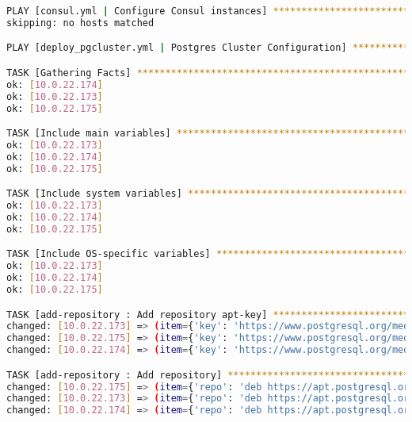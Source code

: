 \begin{flushleft}
\begin{lstlisting}[language=bash, caption=Deploy - Anhang - Deployt,captionpos=b,label={lst:deploy-appendix-deployt},breaklines=true]
PLAY [consul.yml | Configure Consul instances] ********************************************************************************************************************************************************************
skipping: no hosts matched

PLAY [deploy_pgcluster.yml | Postgres Cluster Configuration] ******************************************************************************************************************************************************

TASK [Gathering Facts] ********************************************************************************************************************************************************************************************
ok: [10.0.22.174]
ok: [10.0.22.173]
ok: [10.0.22.175]

TASK [Include main variables] *************************************************************************************************************************************************************************************
ok: [10.0.22.173]
ok: [10.0.22.174]
ok: [10.0.22.175]

TASK [Include system variables] ***********************************************************************************************************************************************************************************
ok: [10.0.22.173]
ok: [10.0.22.174]
ok: [10.0.22.175]

TASK [Include OS-specific variables] ******************************************************************************************************************************************************************************
ok: [10.0.22.173]
ok: [10.0.22.174]
ok: [10.0.22.175]

TASK [add-repository : Add repository apt-key] ********************************************************************************************************************************************************************
changed: [10.0.22.173] => (item={'key': 'https://www.postgresql.org/media/keys/ACCC4CF8.asc'})
changed: [10.0.22.175] => (item={'key': 'https://www.postgresql.org/media/keys/ACCC4CF8.asc'})
changed: [10.0.22.174] => (item={'key': 'https://www.postgresql.org/media/keys/ACCC4CF8.asc'})

TASK [add-repository : Add repository] ****************************************************************************************************************************************************************************
changed: [10.0.22.175] => (item={'repo': 'deb https://apt.postgresql.org/pub/repos/apt/ bookworm-pgdg main'})
changed: [10.0.22.173] => (item={'repo': 'deb https://apt.postgresql.org/pub/repos/apt/ bookworm-pgdg main'})
changed: [10.0.22.174] => (item={'repo': 'deb https://apt.postgresql.org/pub/repos/apt/ bookworm-pgdg main'})


\end{lstlisting}
\end{flushleft}
